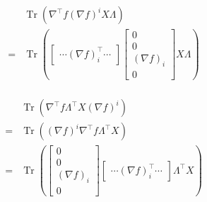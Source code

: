 \documentclass[letterpaper]{article} %
\DeclareMathOperator{\Tr}{Tr} %
\begin{document}
\begin{equation}
	\begin{split}
		&\Tr(\nabla^\top f(\nabla f)^iX\Lambda)\\
		=&\Tr(
		\begin{bmatrix}
		\cdots(\nabla f)^\top_i\cdots 
		\end{bmatrix}
		\begin{bmatrix}
			0 \\0 \\(\nabla f)_i\\	0 
		\end{bmatrix}X\Lambda)\\
	\end{split}
\end{equation}

\begin{equation}
	\begin{split}
		&\Tr(\nabla^\top f\Lambda^\top X(\nabla f)^i)\\
		=&\Tr((\nabla f)^i\nabla^\top f\Lambda^\top X)\\
		=&\Tr(
		\begin{bmatrix}
			0 \\0 \\(\nabla f)_i\\0 
		\end{bmatrix}
		\begin{bmatrix}
			\cdots(\nabla f)^\top_i\cdots 
		\end{bmatrix}\Lambda^\top X)
	\end{split}
\end{equation}
\end{document}
